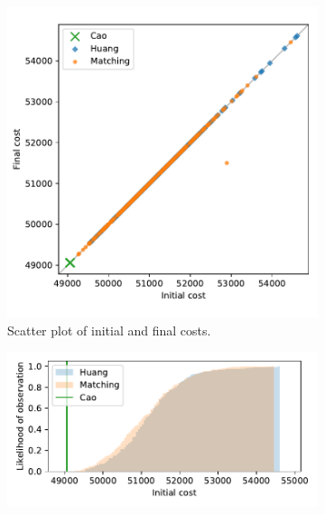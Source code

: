 \documentclass[11pt]{article}
\begin{document}
\begin{figure}
    \begin{subfigure}{.5\textwidth}
        \includegraphics[width=\linewidth]{Fig7a.pdf}
        \caption{Scatter plot of initial and final costs.}
    \end{subfigure}
    \hfill%
    \begin{subfigure}{.5\textwidth}
        \includegraphics[width=\linewidth]{Fig7b1.pdf}


\end{subfigure}
\end{figure}
\end{document}

